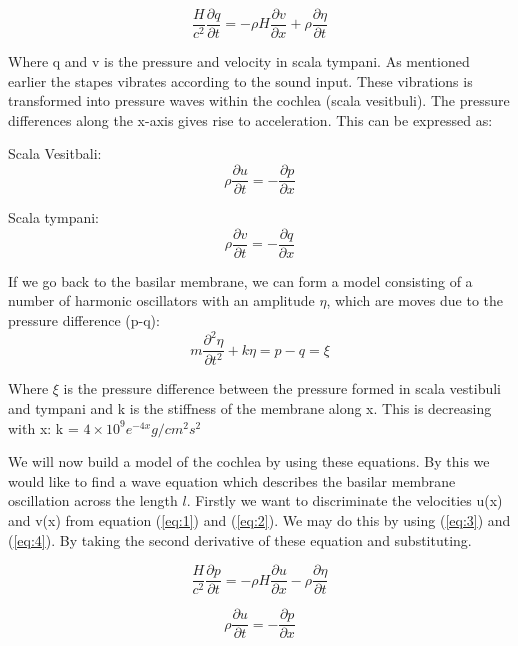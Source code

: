 \documentclass[twoside,twocolumn]{article}
\begin{document}
 \begin{equation}\label{eq:2}
\frac{H}{c^2}\frac{\partial q}{\partial t} = -\rho H \frac{\partial v}{\partial x}  + \rho \frac{\partial \eta}{\partial t}
\end{equation}
 
 Where q and v is the pressure and velocity in scala tympani. As mentioned earlier the stapes vibrates according to the sound input. These vibrations is transformed into pressure waves within the cochlea (scala vesitbuli). The pressure differences along the x-axis gives rise to acceleration. This can be expressed as: 

Scala Vesitbali: 
\begin{equation}\label{eq:3}
\rho\frac{\partial u}{\partial t} = -\frac{\partial p}{\partial x} 
\end{equation}

Scala tympani:
\begin{equation}\label{eq:4}
\rho\frac{\partial v}{\partial t} = -\frac{\partial q}{\partial x} 
\end{equation}

If we go back to the basilar membrane, we can form a model consisting of a number of harmonic oscillators with an amplitude $\eta$, which are moves due to the pressure difference (p-q): 
\begin{equation}
m\frac{\partial^2\eta}{\partial t^2} + k\eta = p-q = \xi
\end{equation}

Where $\xi$ is the pressure difference between the pressure formed in scala vestibuli and tympani and k is the stiffness of the membrane along x. This is decreasing with x: k = $4\times10^9 e^{-4x}g/cm^2s^2$

\bigskip

We will now build a model of the cochlea by using these equations. By this we would like to find a wave equation which describes the basilar membrane oscillation across the length $l$. Firstly we want to discriminate the velocities u(x) and v(x) from equation (\ref{eq:1}) and (\ref{eq:2}). We may do this by using (\ref{eq:3}) and (\ref{eq:4}). By taking the second derivative of these equation and substituting. 
\bigskip

 \begin{equation}
\frac{H}{c^2}\frac{\partial p}{\partial t} = -\rho H \frac{\partial u}{\partial x}  - \rho \frac{\partial \eta}{\partial t}
\end{equation}

\begin{equation}
\rho\frac{\partial u}{\partial t} = -\frac{\partial p}{\partial x} 
\end{equation}
\end{document}
